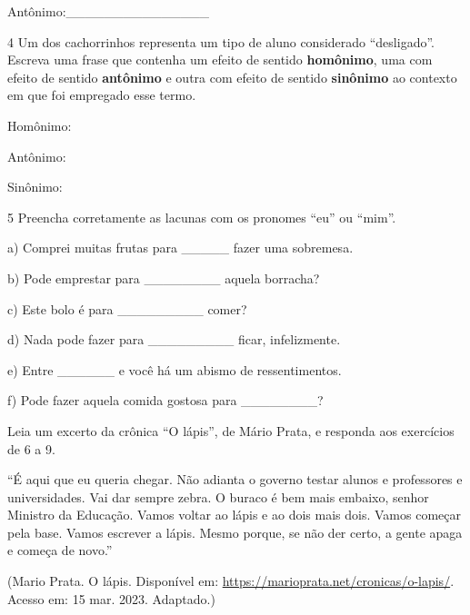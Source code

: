 Antônimo:\_\_\_\_\_\_\_\_\_\_\_\_\_\_\_


\num{4} Um dos cachorrinhos representa um tipo de aluno considerado
``desligado''. Escreva uma frase que contenha um efeito de sentido
\textbf{homônimo}, uma com efeito de sentido \textbf{antônimo} e outra
com efeito de sentido \textbf{sinônimo} ao contexto em que foi empregado
esse termo.

Homônimo:

Antônimo:

Sinônimo:


\num{5} Preencha corretamente as lacunas com os pronomes ``eu'' ou
``mim''.

a) Comprei muitas frutas para \_\_\_\_\_ fazer uma sobremesa.

b) Pode emprestar para \_\_\_\_\_\_\_\_ aquela borracha?

c) Este bolo é para \_\_\_\_\_\_\_\_\_ comer?

d) Nada pode fazer para \_\_\_\_\_\_\_\_\_ ficar, infelizmente.

e) Entre \_\_\_\_\_\_ e você há um abismo de ressentimentos.

f) Pode fazer aquela comida gostosa para \_\_\_\_\_\_\_\_?


Leia um excerto da crônica ``O lápis'', de Mário Prata, e responda aos
exercícios de 6 a 9.

``É aqui que eu queria chegar. Não adianta o governo testar alunos e
professores e universidades. Vai dar sempre zebra. O buraco é bem mais
embaixo, senhor Ministro da Educação. Vamos voltar ao lápis e ao dois
mais dois. Vamos começar pela base. Vamos escrever a lápis. Mesmo
porque, se não der certo, a gente apaga e começa de novo.''

(Mario Prata. O lápis. Disponível em:
\url{https://marioprata.net/cronicas/o-lapis/}. Acesso em: 15 mar. 2023.
Adaptado.)

